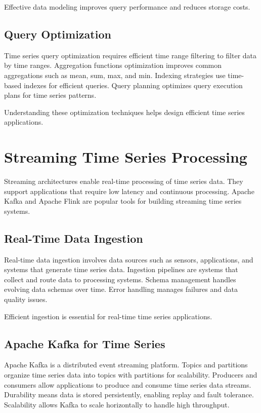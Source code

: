 Effective data modeling improves query performance and reduces storage costs.

\subsection{Query Optimization}

Time series query optimization requires efficient time range filtering to filter data by time ranges. Aggregation functions optimization improves common aggregations such as mean, sum, max, and min. Indexing strategies use time-based indexes for efficient queries. Query planning optimizes query execution plans for time series patterns.

Understanding these optimization techniques helps design efficient time series applications.

\section{Streaming Time Series Processing}

Streaming architectures enable real-time processing of time series data. They support applications that require low latency and continuous processing. Apache Kafka and Apache Flink are popular tools for building streaming time series systems.

\subsection{Real-Time Data Ingestion}

Real-time data ingestion involves data sources such as sensors, applications, and systems that generate time series data. Ingestion pipelines are systems that collect and route data to processing systems. Schema management handles evolving data schemas over time. Error handling manages failures and data quality issues.

Efficient ingestion is essential for real-time time series applications.

\subsection{Apache Kafka for Time Series}

Apache Kafka is a distributed event streaming platform. Topics and partitions organize time series data into topics with partitions for scalability. Producers and consumers allow applications to produce and consume time series data streams. Durability means data is stored persistently, enabling replay and fault tolerance. Scalability allows Kafka to scale horizontally to handle high throughput.


